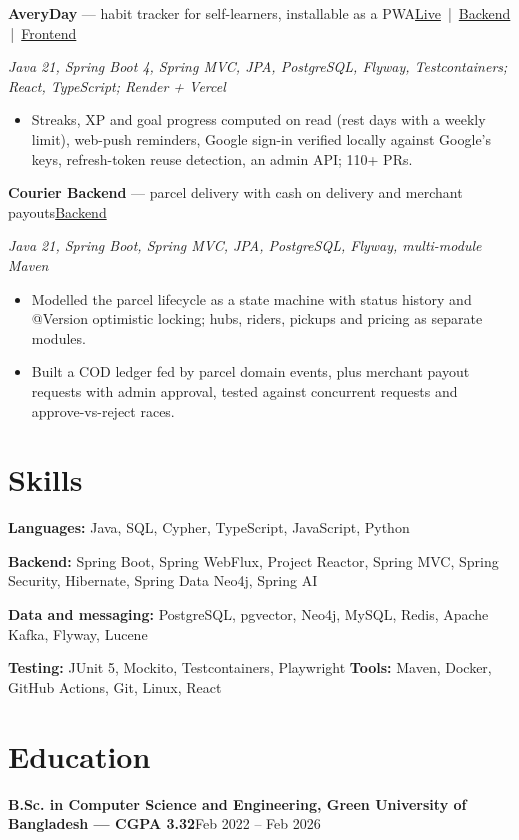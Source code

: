 \documentclass[10pt, letterpaper]{article}
\newenvironment{highlights}{
    \begin{itemize}[topsep=1pt, parsep=1pt, partopsep=0pt, itemsep=0pt, leftmargin=12pt]
}{
    \end{itemize}
}
\newcommand{\entry}[2]{\textbf{#1}\hfill #2\par}
\newcommand{\project}[3]{\textbf{#1} --- #2\hfill{\small #3}\par}
\newcommand{\tech}[1]{{\small\textit{#1}}\par}
\begin{document}
\vspace{1pt}
\project{AveryDay}{habit tracker for self-learners, installable as a PWA}{\href{https://averyday.vercel.app}{Live} \,|\, \href{https://github.com/nay-eem-01/habit-tracker}{Backend} \,|\, \href{https://github.com/nay-eem-01/habit-tracker_web}{Frontend}}
\tech{Java 21, Spring Boot 4, Spring MVC, JPA, PostgreSQL, Flyway, Testcontainers; React, TypeScript; Render + Vercel}
\begin{highlights}
    \item Streaks, XP and goal progress computed on read (rest days with a weekly limit), web-push reminders, Google sign-in verified locally against Google's keys, refresh-token reuse detection, an admin API; 110+ PRs.
\end{highlights}

\vspace{1pt}
\project{Courier Backend}{parcel delivery with cash on delivery and merchant payouts}{\href{https://github.com/nay-eem-01/delivery_app}{Backend}}
\tech{Java 21, Spring Boot, Spring MVC, JPA, PostgreSQL, Flyway, multi-module Maven}
\begin{highlights}
    \item Modelled the parcel lifecycle as a state machine with status history and @Version optimistic locking; hubs, riders, pickups and pricing as separate modules.
    \item Built a COD ledger fed by parcel domain events, plus merchant payout requests with admin approval, tested against concurrent requests and approve-vs-reject races.
\end{highlights}

\section{Skills}
\textbf{Languages:} Java, SQL, Cypher, TypeScript, JavaScript, Python\par
\textbf{Backend:} Spring Boot, Spring WebFlux, Project Reactor, Spring MVC, Spring Security, Hibernate, Spring Data Neo4j, Spring AI\par
\textbf{Data and messaging:} PostgreSQL, pgvector, Neo4j, MySQL, Redis, Apache Kafka, Flyway, Lucene\par
\textbf{Testing:} JUnit 5, Mockito, Testcontainers, Playwright \quad \textbf{Tools:} Maven, Docker, GitHub Actions, Git, Linux, React\par

\section{Education}
\entry{B.Sc. in Computer Science and Engineering, Green University of Bangladesh --- CGPA 3.32}{Feb 2022 -- Feb 2026}
\end{document}
